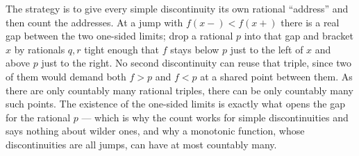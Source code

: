 \documentclass[main.tex]{subfiles}
\begin{document}
\begin{Reflection}
The strategy is to give every simple discontinuity its own rational ``address'' and then count the addresses. At a jump with $f(x-) < f(x+)$ there is a real gap between the two one-sided limits; drop a rational $p$ into that gap and bracket $x$ by rationals $q, r$ tight enough that $f$ stays below $p$ just to the left of $x$ and above $p$ just to the right. No second discontinuity can reuse that triple, since two of them would demand both $f > p$ and $f < p$ at a shared point between them. As there are only countably many rational triples, there can be only countably many such points. The existence of the one-sided limits is exactly what opens the gap for the rational $p$ --- which is why the count works for simple discontinuities and says nothing about wilder ones, and why a monotonic function, whose discontinuities are all jumps, can have at most countably many.
\end{Reflection}
\end{document}
